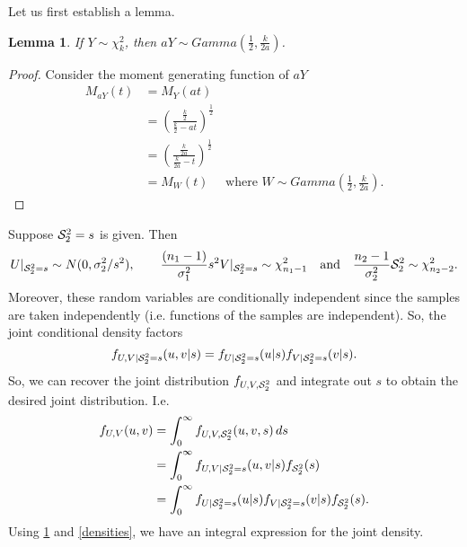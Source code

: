 \documentclass{stat_homework}
\newtheorem{lemma}{Lemma}
\begin{document}
\begin{solution}
  Let us first establish a lemma.
  \begin{lemma} If $Y\sim \chi^2_k$, then $aY\sim Gamma(\frac12,\frac k{2a})$.
  \label{lem1}
  \end{lemma}
  \begin{proof}
  Consider the moment generating function of $aY$
\begin{align*}
  M_{a Y}(t) 
  & = M_{Y} (a t)  \\
  & = \left( \frac{ \frac k2 }{ \frac k2 - a t} \right)^{\frac 12} \\
  & = \left( \frac{ \frac k{2a} }{ \frac k{2a} - t} \right)^{\frac 12} \\
  & = M_W(t) \quad\text{ where }W \sim Gamma\left(\frac12,\frac k{2a}\right).
\end{align*}
  \end{proof}
  Suppose $\mathcal S_2^2 = s$ is given.  Then 
  \begin{equation}
    U|_{\mathcal S_2^2=s}\sim N(0,\sigma_2^2/s^2),\quad\quad
    \frac {(n_1 - 1)}{\sigma_1^2} s^2V|_{\mathcal S_2^2=s} \sim \chi^2_{n_1-1}\quad\text{and}\quad \frac{n_2-1}{\sigma_2^2}\mathcal S_2^2\sim \chi^2_{n_2-2}.
    \label{densities}
  \end{equation}
  Moreover, these random variables are conditionally independent since the samples are taken independently (i.e. functions of the samples are independent).  So, the joint conditional density factors 
  $$
    f_{U,V|{\mathcal S_2^2 = s}}(u,v|s) = f_{U|\mathcal S^2_2=s}(u|s)f_{V|\mathcal S^2_2=s}(v|s).
  $$
  So, we can recover the joint distribution $f_{U,V,\mathcal S^2_2}$ and integrate out $s$ to obtain the desired joint distribution. I.e.
  \begin{align*}
  f_{U,V}(u,v) 
  &= \int_0^\infty f_{U,V,\mathcal S^2_2}(u,v,s)\,ds \\ 
  &= \int_0^\infty f_{U,V|{\mathcal S_2^2 = s}}(u,v|s) f_{\mathcal S^2_2}(s)\\
  &= \int_0^\infty f_{U|\mathcal S^2_2=s}(u|s)f_{V|\mathcal S^2_2=s}(v|s) f_{\mathcal S^2_2}(s).
  \end{align*}
  Using \cref{lem1} and \eqref{densities}, we have an integral expression for the joint density.
\end{solution}
\end{document}
